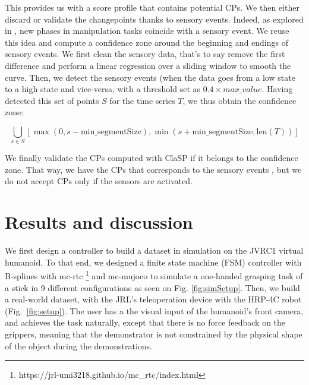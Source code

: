 \documentclass[conference]{IEEEtran}
\begin{document}
This provides us with a score profile that contains potential CPs. We then either discard or validate the changepoints thanks to sensory events. Indeed, as explored in \cite{sensory_seg}, new phases in manipulation tasks coincide  with a sensory event. We reuse this idea and compute a confidence zone around the beginning and endings of sensory events. We first clean the sensory data, that's to say remove the first difference and perform a linear regression over a sliding window to smooth the curve. Then,  we detect the sensory events  (when the data goes from a low state to a high  state and vice-versa, with a threshold set as $0.4\times max\_value$. Having detected this set of points $S$ for the time series $T$, we thus obtain the confidence zone:

\begin{equation}
        \bigcup_{s \in S} \left[ \max(0, s - \text{min\_segmentSize}),\min(s + \text{min\_segmentSize}, \text{len}(T)) \right]
\end{equation}

We finally validate the CPs computed with ClaSP if it belongs to the confidence zone. That way, we have the CPs that corresponds to the sensory events , but we do not accept CPs only if the sensors are activated.

\section{Results and discussion} \label{results}

 We first design a controller to build a dataset in  simulation on the JVRC1 virtual humanoid. To that end, we designed a finite state machine (FSM) controller with B-splines with mc-rtc \footnote{https://jrl-umi3218.github.io/mc\_rtc/index.html} and mc-mujoco \cite{singh2023mc} to simulate a one-handed grasping task of a stick in 9 different configurations as seen on Fig. \ref{fig:simSetup}. Then, we build a real-world dataset, with the JRL's teleoperation device  with the HRP-4C robot (Fig.~\ref{fig:setup}). The user has a the visual input of the humanoid's front camera, and achieves the task naturally, except that there is no force  feedback on the grippers, meaning that the demonstrator is not constrained by the physical shape of the object during the demonstrations.
\end{document}
